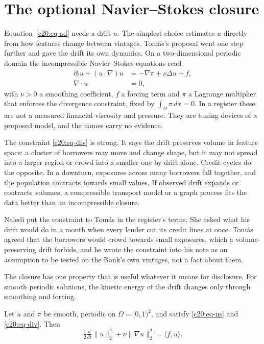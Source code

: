\section{The optional Navier--Stokes closure}

Equation~\eqref{c20:eq-ad} needs a drift $u$. The simplest choice estimates $u$ directly from how features
change between vintages. Tom\'as's proposal went one step further and gave the drift its
own dynamics. On a two-dimensional periodic domain the incompressible Navier--Stokes
equations read
\begin{align}
\partial_t u+(u\cdot\nabla)u&=-\nabla\pi+\nu\Delta u+f,\label{c20:eq-ns}\\
\nabla\cdot u&=0,\label{c20:eq-div}
\end{align}
with $\nu>0$ a smoothing coefficient, $f$ a forcing term and $\pi$ a Lagrange multiplier that enforces the divergence constraint, fixed by $\int_\Omega\pi\,dx=0$. In a register these are not a measured
financial viscosity and pressure. They are tuning devices of a proposed model, and the
names carry no evidence.

The constraint \eqref{c20:eq-div} is strong. It says the drift preserves volume in feature space: a
cluster of borrowers may move and change shape, but it may not spread into a larger region
or crowd into a smaller one by drift alone. Credit cycles do the opposite. In a downturn,
exposures across many borrowers fall together, and the population contracts towards small
values. If observed drift expands or contracts volumes, a compressible transport model or a
graph process fits the data better than an incompressible closure.

Naledi put the constraint to Tom\'as in the register's terms. She asked what his drift
would do in a month when every lender cut its credit lines at once. Tom\'as agreed that the
borrowers would crowd towards small exposures, which a volume-preserving drift forbids,
and he wrote the constraint into his note as an assumption to be tested on the Bank's own
vintages, not a fact about them.

The closure has one property that is useful whatever it means for disclosure. For smooth
periodic solutions, the kinetic energy of the drift changes only through smoothing and forcing.

\begin{proposition}\label{c20:prop-energy}
Let $u$ and $\pi$ be smooth, periodic on $\Omega=[0,1)^2$, and satisfy \eqref{c20:eq-ns} and \eqref{c20:eq-div}. Then
\begin{equation}\label{c20:eq-energy}
\tfrac12\tfrac{d}{dt}\|u\|_2^2+\nu\|\nabla u\|_2^2=\langle f,u\rangle.
\end{equation}
\end{proposition}

